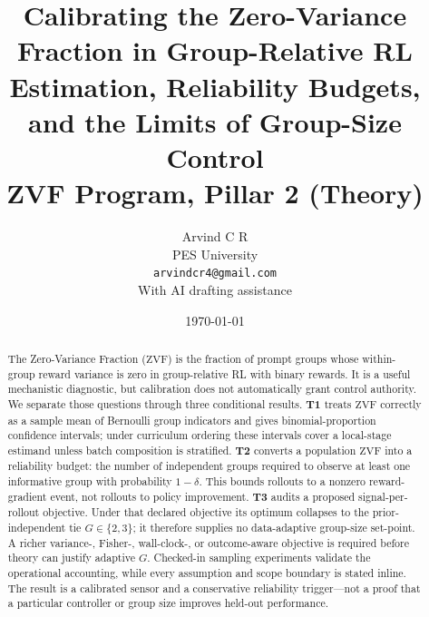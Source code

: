 \documentclass[11pt]{article}
\title{\textbf{Calibrating the Zero-Variance Fraction in Group-Relative RL}\\[4pt]
\large Estimation, Reliability Budgets, and the Limits of Group-Size Control\\[4pt]
\large ZVF Program, Pillar 2 (Theory)}
\author{Arvind C R\\PES University\\\texttt{arvindcr4@gmail.com}\\[2pt]
\small With AI drafting assistance}
\date{\today}
\theoremstyle{plain}
\theoremstyle{definition}
\theoremstyle{remark}
\newcommand{\ZVF}{\ensuremath{\mathrm{ZVF}}}
\newcommand{\1}{\mathbb{1}}
\begin{document}
\maketitle

\begin{abstract}
The Zero-Variance Fraction (\ZVF{}) is the fraction of prompt groups whose
within-group reward variance is zero in group-relative RL with binary rewards.
It is a useful mechanistic diagnostic, but calibration does not automatically
grant control authority. We separate those questions through three conditional
results. \textbf{T1} treats \ZVF{} correctly as a sample mean of Bernoulli group
indicators and gives binomial-proportion confidence intervals; under curriculum
ordering these intervals cover a local-stage estimand unless batch composition is
stratified. \textbf{T2} converts a population \ZVF{} into a reliability budget:
the number of independent groups required to observe at least one informative
group with probability $1-\delta$. This bounds rollouts to a nonzero
reward-gradient event, not rollouts to policy improvement. \textbf{T3} audits a
proposed signal-per-rollout objective. Under that declared objective its optimum
collapses to the prior-independent tie $G\in\{2,3\}$; it therefore supplies no
data-adaptive group-size set-point. A richer variance-, Fisher-, wall-clock-, or
outcome-aware objective is required before theory can justify adaptive $G$.
Checked-in sampling experiments validate the operational accounting, while every
assumption and scope boundary is stated inline. The result is a calibrated sensor and a
conservative reliability trigger---not a proof that a particular controller or
group size improves held-out performance.
\end{abstract}
\end{document}
